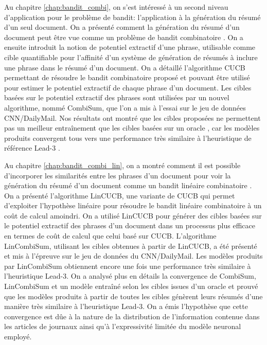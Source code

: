 Au chapitre \ref{chap:bandit_combi}, on s'est intéressé
à un second niveau d'application pour le problème de bandit: 
l'application à la génération du résumé 
d'un seul document.
On a présenté comment la génération du résumé d'un document 
peut être vue comme un problème de bandit combinatoire \citep{pmlr-v28-chen13a}.
On a ensuite introduit la notion de potentiel extractif d'une phrase,
utilisable comme cible quantifiable pour l'affinité d'un système de génération 
de résumés à inclure une phrase dans le résumé d'un document.
On a détaillé l'algorithme CUCB \citep{pmlr-v28-chen13a}
permettant de résoudre le bandit combinatoire proposé et pouvant 
être utilisé pour estimer le potentiel extractif de chaque phrase 
d'un document.
Les cibles basées sur le potentiel extractif des phrases 
sont utilisées par un nouvel algorithme, nommé CombiSum, 
que l'on a mis à l'essai sur le jeu de données CNN/DailyMail.
Nos résultats ont montré que les cibles proposées ne permettent 
pas un meilleur entraînement que les cibles basées sur un oracle 
\citep{10.5555/3298483.3298681}, car les modèles produits 
convergent tous vers une performance très similaire à l'heuristique 
de référence Lead-3 \citep{10.5555/3298483.3298681}.

Au chapitre \ref{chap:bandit_combi_lin}, on a montré comment 
il est possible d'incorporer les similarités entre les phrases 
d'un document pour voir la génération du résumé d'un document 
comme un bandit linéaire combinatoire \citep{NEURIPS2018_207f8801}.
On a présenté l'algorithme LinCUCB, une variante de CUCB 
qui permet d'exploiter l'hypothèse linéaire pour résoudre 
le bandit linéaire combinatoire à un coût de calcul amoindri.
On a utilisé LinCUCB pour générer des cibles basées sur le potentiel 
extractif des phrases d'un document dans un processus plus efficace 
en termes de coût de calcul que celui basé sur CUCB.
L'algorithme LinCombiSum, utilisant les cibles obtenues à partir de LinCUCB,
a été présenté et mis à l'épreuve sur le jeu de données du CNN/DailyMail.
Les modèles produits par LinCombiSum obtiennent encore une fois une performance 
très similaire à l'heuristique Lead-3.
On a analysé plus en détails la convergence de CombiSum, LinCombiSum et un
modèle entraîné selon les cibles issues d'un oracle et prouvé que 
les modèles produits à partir de toutes les cibles génèrent 
leurs résumés d'une manière très similaire à l'heuristique Lead-3.
On a émis l'hypothèse que cette convergence est dûe à la nature 
de la distribution de l'information contenue dans les articles de journaux ainsi 
qu'à l'expressivité limitée du modèle neuronal employé.

